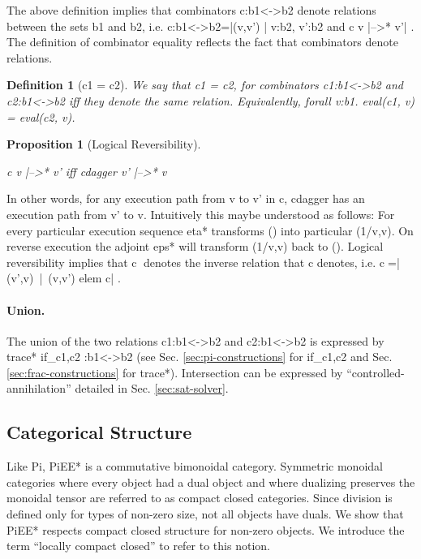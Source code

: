 \documentclass[preprint]{sigplanconf}
\newcommand{\xcomment}[2]{\textbf{#1:~\textsl{#2}}}
\newcommand{\roshan}[1]{\xcomment{Roshan}{#1}}
\newtheorem{definition}[theorem]{Definition}
\newtheorem{proposition}[theorem]{Proposition}
\begin{document}
The above definition implies that combinators {{c:b1<->b2}} denote
relations between the sets {{b1}} and {{b2}}, i.e.
{{c:b1<->b2={|(v,v') | v:b2, v':b2 and c v |-->* v'|} }}.  The
definition of combinator equality reflects the fact that combinators
denote relations.

\begin{definition}[{{c1 = c2}}]
We say that {{c1 = c2}}, for combinators {{c1:b1<->b2}} and
{{c2:b1<->b2}} iff they denote the same relation. Equivalently,
{{forall v:b1. eval(c1, v) = eval(c2, v)}}.
\end{definition}

\begin{proposition}[Logical Reversibility]
\label{prop:logrev2} ~

{{c v |-->* v'}} iff {{ c{dagger} v' |-->* v}}
\end{proposition}

In other words, for any execution path from {{v}} to {{v'}} in {{c}},
{{c{dagger} }} has an execution path from {{v'}} to {{v}}.
Intuitively this maybe understood as follows: For every particular
execution sequence {{eta*}} transforms {{()}} into particular
{{(1/v,v)}}. On reverse execution the adjoint {{eps*}} will transform
{{(1/v,v)}} back to {{()}}.  Logical reversibility implies that
{{c^^^}} denotes the inverse relation that {{c}} denotes, i.e.
{{c^^^={|(v',v)~|~(v,v') elem c|} }}.


\paragraph*{Union.}
The union of the two relations {{c1:b1<->b2}} and {{c2:b1<->b2}} is
expressed by {{trace* if_{c1,c2} :b1<->b2}} (see Sec.
\ref{sec:pi-constructions} for {{if_{c1,c2} }} and
Sec. \ref{sec:frac-constructions} for {{trace*}}). Intersection can be
expressed by ``controlled-annihilation'' detailed in
Sec. \ref{sec:sat-solver}.


\subsection{Categorical Structure}

Like {{Pi}}, {{PiEE*}} is a commutative bimonoidal category.
Symmetric monoidal categories where every object had a dual object and
where dualizing preserves the monoidal tensor are referred to as
compact closed categories. Since division is defined only for types of
non-zero size, not all objects have duals.  We show that {{PiEE*}}
respects compact closed structure for non-zero objects. We introduce
the term ``locally compact closed'' to refer to this notion.
\end{document}
